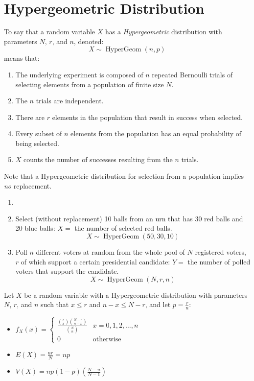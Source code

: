 \documentclass[letterpaper,12pt,fleqn]{article}
\DeclareMathOperator{\hg}{HyperGeom}
\begin{document}
\section*{Hypergeometric Distribution}

\begin{definition}
  To say that a random variable \(X\) has a \emph{Hypergeometric} distribution with parameters \(N\), \(r\), and \(n\),
  denoted:
  \[X\sim\hg(n,p)\]
  means that:
  \begin{enumerate}
  \item The underlying experiment is composed of \(n\) repeated Bernoulli trials of selecting elements from a population of
    finite size \(N\).
  \item The \(n\) trials are independent.
  \item There are \(r\) elements in the population that result in success when selected.
  \item Every subset of \(n\) elements from the population has an equal probability of being selected.
  \item \(X\) counts the number of successes resulting from the \(n\) trials.
  \end{enumerate}
\end{definition}

Note that a Hypergeometric distribution for selection from a population implies \emph{no} replacement.

\begin{example}
  \begin{enumerate}
  \item[]
  \item Select (without replacement) 10 balls from an urn that has 30 red balls and 20 blue balls: \(X=\) the number of
    selected red balls.
    \[X\sim\hg(50,30,10)\]
  \item Poll \(n\) different voters at random from the whole pool of \(N\) registered voters, \(r\) of which support a
    certain presidential candidate: \(Y=\) the number of polled voters that support the candidate.
    \[X\sim\hg(N,r,n)\]
  \end{enumerate}
\end{example}

\begin{theorem}
  Let \(X\) be a random variable with a Hypergeometric distribution with parameters \(N\), \(r\), and \(n\) such that
  \(x\le r\) and \(n-x\le N-r\), and let \(p=\frac{r}{n}\):
  \begin{itemize}
  \item \(f_X(x)=\begin{cases}
    \frac{\binom{r}{x}\binom{N-r}{n-x}}{\binom{N}{n}} & x=0,1,2,\ldots,n \\
    0 & \text{otherwise}
  \end{cases}\)
  \item \(E(X)=\frac{nr}{N}=np\)
  \item \(V(X)=np(1-p)\left(\frac{N-n}{N-1}\right)\)
  \end{itemize}
\end{theorem}
\end{document}
